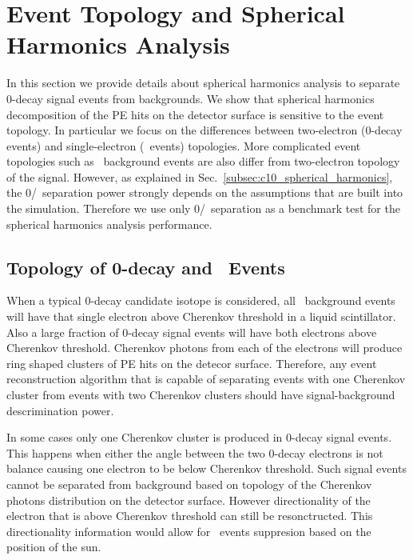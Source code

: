 \section{Event Topology and Spherical Harmonics Analysis}
\label{sec:topology_and_harmonics}

In this section we provide details about spherical harmonics analysis to separate 0\nbb-decay signal events from backgrounds. 
We show that spherical harmonics decomposition of the PE hits on the detector surface is sensitive to the event topology. In particular
we focus on the differences between two-electron (0\nbb-decay events) and single-electron (\B~events) topologies. More complicated 
event topologies such as \C~background events are also differ from two-electron topology of the signal. However, as explained in 
Sec.~\ref{subsec:c10_spherical_harmonics}, the 0\nbb/\C~separation power strongly depends on the assumptions that are built into the 
simulation. Therefore we use only 0\nbb/\B~separation as a benchmark test for the spherical harmonics analysis performance.


\subsection{Topology of 0\nbb-decay and \B~Events}
\label{subsec:topology}

When a typical 0\nbb-decay candidate isotope is considered, all \B~background events will have that single electron above Cherenkov threshold
in a liquid scintillator. Also a large fraction of 0\nbb-decay signal events will have both electrons above Cherenkov threshold. Cherenkov photons
from each of the electrons will produce ring shaped clusters of PE hits on the detecor surface. Therefore, any event reconstruction algorithm 
that is capable of separating events with one Cherenkov cluster from events with two Cherenkov clusters should have signal-background 
descrimination power. 

In some cases only one Cherenkov cluster is produced in 0\nbb-decay signal events. This happens when either the angle between the two 
0\nbb-decay electrons is not balance causing one electron to be below Cherenkov threshold. 
Such signal events cannot be separated from background based on topology of the Cherenkov photons distribution on the detector surface. 
However directionality of the electron that is above Cherenkov threshold can still be resonctructed. This directionality information would allow
for \B~events suppresion based on the position of the sun.

